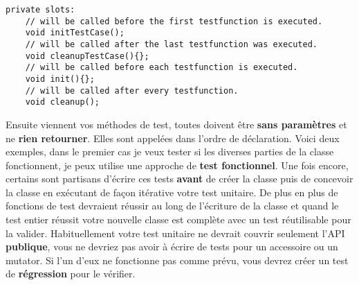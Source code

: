 \begin{verbatim}
private slots:
    // will be called before the first testfunction is executed.
    void initTestCase();
    // will be called after the last testfunction was executed.
    void cleanupTestCase(){};
    // will be called before each testfunction is executed.
    void init(){};
    // will be called after every testfunction.
    void cleanup();
\end{verbatim}

Ensuite viennent vos m\'ethodes de test, toutes doivent \^etre \textbf{sans param\`etres} et ne \textbf{rien retourner}. Elles sont appel\'ees dans l'ordre de d\'eclaration. Voici deux exemples, dans le premier cas je veux tester si les diverses parties de la classe fonctionnent, je peux utilise une approche de \textbf{test fonctionnel}. Une fois encore, certains sont partisans d'\'ecrire ces tests \textbf{avant} de cr\'eer la classe puis de concevoir la classe en ex\'ecutant de fa\c{c}on it\'erative votre test unitaire. De plus en plus de fonctions de test devraient r\'eussir au long de l'\'ecriture de la classe et quand le test entier r\'eussit votre nouvelle classe est compl\`ete avec un test r\'eutilisable pour la valider.
Habituellement votre test unitaire ne devrait couvrir seulement l'API \textbf{publique}, vous ne devriez pas avoir \`a \'ecrire de tests pour un accessoire ou un mutator. Si l'un d'eux ne fonctionne pas comme pr\'evu, vous devrez cr\'eer un test de \textbf{r\'egression} pour le v\'erifier.


